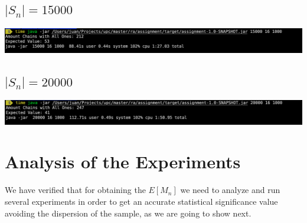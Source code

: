\documentclass[12pt, a4paper]{article}
\begin{document}
\subsection{$|S_n| = 15000$}

\begin{minipage}[t]{\linewidth}
  \includegraphics[width=\textwidth]{experiment6}
  \label{fig:experiment6}
\end{minipage}

\subsection{$|S_n| = 20000$}

\begin{minipage}[t]{\linewidth}
  \includegraphics[width=\textwidth]{experiment7}
  \label{fig:experiment7}
\end{minipage}


\section{Analysis of the Experiments}\label{an:data}
We have verified that for obtaining the $E[M_n]$ we need to analyze and run
several experiments in order to get an accurate statistical significance value
avoiding the dispersion of the sample, as we are going to show next.

\begin{minipage}[t]{\linewidth}
\centering
{}
\label{fig:dist1}
\end{minipage}
\end{document}
